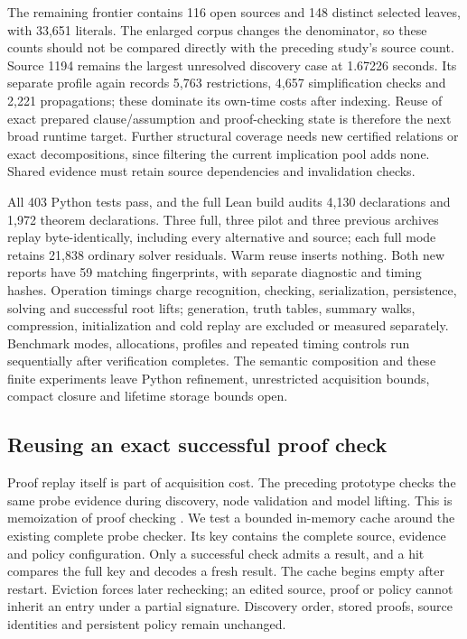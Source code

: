 \documentclass[11pt,a4paper]{article}
\numberwithin{equation}{section}
\theoremstyle{plain}
\theoremstyle{definition}
\theoremstyle{remark}
\begin{document}
The remaining frontier contains 116 open sources and 148 distinct selected leaves, with 33,651 literals. The enlarged corpus changes the denominator, so these counts should not be compared directly with the preceding study's source count. Source 1194 remains the largest unresolved discovery case at 1.67226 seconds. Its separate profile again records 5,763 restrictions, 4,657 simplification checks and 2,221 propagations; these dominate its own-time costs after indexing. Reuse of exact prepared clause/assumption and proof-checking state is therefore the next broad runtime target. Further structural coverage needs new certified relations or exact decompositions, since filtering the current implication pool adds none. Shared evidence must retain source dependencies and invalidation checks.

All 403 Python tests pass, and the full Lean build audits 4,130 declarations and 1,972 theorem declarations. Three full, three pilot and three previous archives replay byte-identically, including every alternative and source; each full mode retains 21,838 ordinary solver residuals. Warm reuse inserts nothing. Both new reports have 59 matching fingerprints, with separate diagnostic and timing hashes. Operation timings charge recognition, checking, serialization, persistence, solving and successful root lifts; generation, truth tables, summary walks, compression, initialization and cold replay are excluded or measured separately. Benchmark modes, allocations, profiles and repeated timing controls run sequentially after verification completes. The semantic composition and these finite experiments leave Python refinement, unrestricted acquisition bounds, compact closure and lifetime storage bounds open.

\subsection{Reusing an exact successful proof check}
\label{sec:checked-probe-reuse}

Proof replay itself is part of acquisition cost. The preceding prototype checks the same probe evidence during discovery, node validation and model lifting. This is memoization of proof checking \citep{michie1968}. We test a bounded in-memory cache around the existing complete probe checker. Its key contains the complete source, evidence and policy configuration. Only a successful check admits a result, and a hit compares the full key and decodes a fresh result. The cache begins empty after restart. Eviction forces later rechecking; an edited source, proof or policy cannot inherit an entry under a partial signature. Discovery order, stored proofs, source identities and persistent policy remain unchanged.
\end{document}
